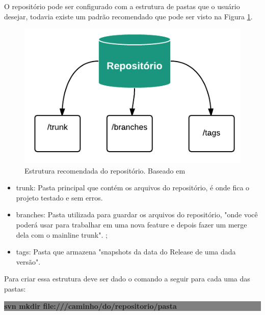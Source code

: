 O repositório pode ser configurado com a estrutura de pastas que o usuário desejar, todavia existe um padrão recomendado que pode ser visto na Figura
\ref{fig:estrutura_repo}.

\begin{figure}[!htb]
\centering
\includegraphics[scale=1]{figuras/estrutura_repo.png}
\caption{Estrutura recomendada do repositório. Baseado em \cite{svn-book}}
\label{fig:estrutura_repo}
\end{figure}

\begin{itemize}
  \item trunk: Pasta principal que contém os arquivos do repositório, é onde fica o projeto testado e sem erros. \cite{wiki-svn}

  \item branches: Pasta utilizada para guardar os arquivos do repositório, "onde você poderá usar para trabalhar em uma nova feature e depois fazer um merge dela com o mainline trunk". \cite{wiki-svn};

  \item tags: Pasta que armazena "snapshots da data do Release de uma dada versão". \cite{wiki-svn}
\end{itemize}

Para criar essa estrutura deve ser dado o comando a seguir para cada uma das pastas: \cite{wiki-svn}

\begin{centering}

\colorbox{Gray}{
\begin{minipage}{280px}
  \textbf{svn mkdir file:///caminho/do/repositorio/pasta}
\end{minipage}
}

\end{centering}


